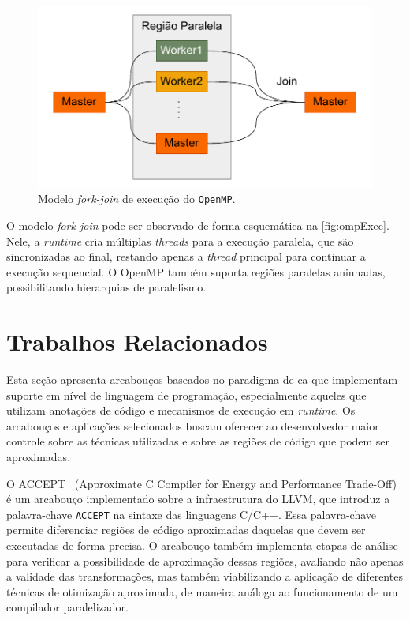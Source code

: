 \begin{figure}[htb]
    \caption{Modelo \textit{fork-join} de execução do \texttt{OpenMP}.}
    \label{fig:ompExec}
    \includegraphics[scale=0.7]{figuras/omp_exec.pdf}
    \fonte{}
\end{figure}

O modelo \textit{fork-join} pode ser observado de forma esquemática na \autoref{fig:ompExec}. Nele, a \textit{runtime} cria múltiplas \textit{threads} para a execução paralela, que são sincronizadas ao final, restando apenas a \textit{thread} principal para continuar a execução sequencial. O OpenMP também suporta regiões paralelas aninhadas, possibilitando hierarquias de paralelismo.

\section{Trabalhos Relacionados}\label{sec:trabRelac}

Esta seção apresenta arcabouços baseados no paradigma de \gls{ca} que implementam suporte em nível de linguagem de programação, especialmente aqueles que utilizam anotações de código e mecanismos de execução em \textit{runtime}. Os arcabouços e aplicações selecionados buscam oferecer ao desenvolvedor maior controle sobre as técnicas utilizadas e sobre as regiões de código que podem ser aproximadas.

O ACCEPT~\cite{sampson2015} (Approximate C Compiler for Energy and Performance Trade-Off) é um arcabouço implementado sobre a infraestrutura do LLVM, que introduz a palavra-chave \texttt{ACCEPT} na sintaxe das linguagens C/C++. Essa palavra-chave permite diferenciar regiões de código aproximadas daquelas que devem ser executadas de forma precisa. O arcabouço também implementa etapas de análise para verificar a possibilidade de aproximação dessas regiões, avaliando não apenas a validade das transformações, mas também viabilizando a aplicação de diferentes técnicas de otimização aproximada, de maneira análoga ao funcionamento de um compilador paralelizador.

